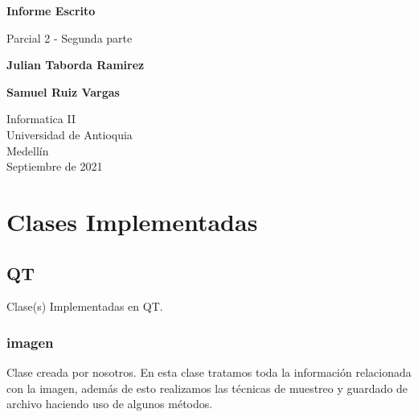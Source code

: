\documentclass{article}
\begin{document}
\begin{titlepage}
    \begin{center}
        \vspace*{1cm}
            
        \Huge
        \textbf{Informe Escrito}
            
        \vspace{0.5cm}
        \LARGE
        Parcial 2 - Segunda parte
            
        \vspace{1.5cm}
            
        \textbf{Julian Taborda Ramirez}
        
        \vspace{0.5cm}
        
        \textbf{Samuel Ruiz Vargas}
            
        \vfill
            
        \vspace{0.8cm}
            
        \Large
        Informatica II\\
        Universidad de Antioquia\\
        Medellín\\
        Septiembre de 2021
            
    \end{center}
\end{titlepage}

\tableofcontents
\vspace*{1.2cm}

\newpage

\section{Clases Implementadas}
\label{clases}

    \begin{flushleft}
    \subsection{QT}
    Clase(s) Implementadas en QT.
    \end{flushleft}
    
    
    \begin{flushleft}
    \subsubsection{imagen}
    Clase creada por nosotros. En esta clase tratamos toda la información relacionada con la imagen, además de esto realizamos las técnicas de muestreo y guardado de archivo haciendo uso de algunos métodos.
    \end{flushleft}
    
\end{document}
